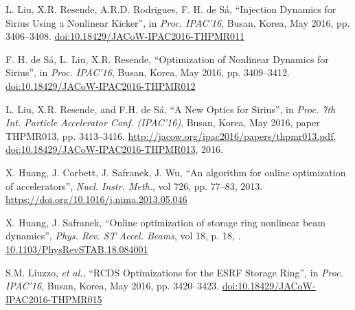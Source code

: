 \documentclass[a4paper,
               keeplastbox,   %
               ]{jacow}
\begin{document}
	\begin{thebibliography}{9} %
	
        

        L. Liu, X.R. Resende, A.R.D. Rodrigues, F. H. de Sá,
       \textquotedblleft{{I}njection {D}ynamics for {S}irius {U}sing a {N}onlinear {K}icker}\textquotedblright,
       in \emph{Proc. IPAC’16}, Busan, Korea, May 2016, pp. 3406--3408.
       \url{doi:10.18429/JACoW-IPAC2016-THPMR011} 
 
        F. H. de Sá, L. Liu, X.R. Resende,
       \textquotedblleft{{O}ptimization of {N}onlinear {D}ynamics for {S}irius}\textquotedblright,
       in \emph{Proc. IPAC’16}, Busan, Korea, May 2016, pp. 3409--3412.
       \url{doi:10.18429/JACoW-IPAC2016-THPMR012}

       L. Liu, X.R. Resende, and F.H. de Sá,
       \textquotedblleft{A New Optics for Sirius}\textquotedblright,
       in \emph{Proc. 7th Int. Particle Accelerator Conf. (IPAC'16)}, 
       Busan, Korea, May 2016, paper THPMR013, pp. 3413--3416,
       \url{http://jacow.org/ipac2016/papers/thpmr013.pdf},
       \url{doi:10.18429/JACoW-IPAC2016-THPMR013}, 2016.
           
		X. Huang, J. Corbett, J. Safranek, J. Wu,
		\textquotedblleft{An algorithm for online optimization of accelerators}\textquotedblright,
		\emph{Nucl.  Instr. Meth.}, vol 726, pp. 77--83, 2013.
        \url{https://doi.org/10.1016/j.nima.2013.05.046} 

		X. Huang, J. Safranek,
		\textquotedblleft{Online optimization of storage ring nonlinear beam dynamics}\textquotedblright,
		\emph{Phys. Rev. ST Accel. Beams}, vol 18, p. 18, .
        \url{10.1103/PhysRevSTAB.18.084001} 
 
        S.M. Liuzzo, \emph{et al.},
        \textquotedblleft{RCDS Optimizations for the ESRF Storage Ring}\textquotedblright,
        in \emph{Proc. IPAC’16}, Busan, Korea, May 2016, pp. 3420--3423.
       \url{doi:10.18429/JACoW-IPAC2016-THPMR015}   
    

\end{thebibliography}
\end{document}
